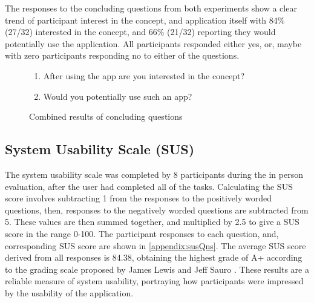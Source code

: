 The responses to the concluding questions from both experiments show a clear trend of participant interest in the concept, and application itself with 84\% (27/32) interested in the concept, and 66\% (21/32) reporting they would potentially use the application. All participants responded either yes, or, maybe with zero participants responding no to either of the questions.

\begin{figure}[H]

\begin{enumerate}
    \item After using the app are you interested in the concept?
    \item Would you potentially use such an app?
\end{enumerate}
\caption{Combined results of concluding questions}
\label{fig:conclAns}
\end{figure}
\FloatBarrier

\subsection{System Usability Scale (SUS)}
The system usability scale was completed by 8 participants during the in person evaluation, after the user had completed all of the tasks. Calculating the SUS score involves subtracting 1 from the responses to the positively worded questions, then, responses to the negatively worded questions are subtracted from 5. These values are then summed together, and multiplied by 2.5 to give a SUS score in the range 0-100. The participant responses to each question, and, corresponding SUS score are shown in \ref{appendix:susQns}. The average SUS score derived from all responses is 84.38, obtaining the highest grade of A+ according to the grading scale proposed by James Lewis and Jeff Sauro \cite{susGrades}. These results are a reliable measure of system usability, portraying how participants were impressed by the usability of the application.

